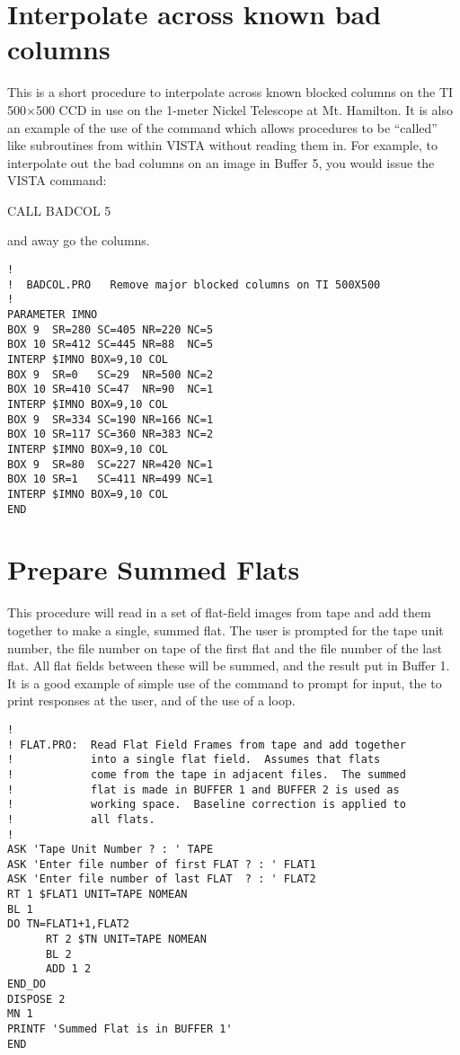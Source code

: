 
\section{Interpolate across known bad columns}

This is a short procedure to interpolate across known blocked columns on the
TI 500$\times$500 CCD in use on the 1-meter Nickel Telescope at Mt. Hamilton.
It is also an example of the use of the  command which allows
procedures to be ``called'' like subroutines from within VISTA without reading
them in.  For example, to interpolate out the bad columns on an image in
Buffer 5, you would issue the VISTA command:

\begin{command}
      \item CALL BADCOL 5
\end{command}

\noindent and away go the columns.

\begin{verbatim}
!
!  BADCOL.PRO   Remove major blocked columns on TI 500X500
!
PARAMETER IMNO
BOX 9  SR=280 SC=405 NR=220 NC=5
BOX 10 SR=412 SC=445 NR=88  NC=5
INTERP $IMNO BOX=9,10 COL
BOX 9  SR=0   SC=29  NR=500 NC=2
BOX 10 SR=410 SC=47  NR=90  NC=1
INTERP $IMNO BOX=9,10 COL
BOX 9  SR=334 SC=190 NR=166 NC=1
BOX 10 SR=117 SC=360 NR=383 NC=2
INTERP $IMNO BOX=9,10 COL
BOX 9  SR=80  SC=227 NR=420 NC=1
BOX 10 SR=1   SC=411 NR=499 NC=1
INTERP $IMNO BOX=9,10 COL
END
\end{verbatim}


\section{Prepare Summed Flats}

This procedure will read in a set of flat-field images from tape and add them
together to make a single, summed flat.  The user is prompted for the tape
unit number, the file number on tape of the first flat and the file number of
the last flat.  All flat fields between these will be summed, and the result
put in Buffer 1.  It is a good example of simple use of the  command
to prompt for input, the  to print responses at the user, and
of the use of a  loop.

\begin{verbatim}
!
! FLAT.PRO:  Read Flat Field Frames from tape and add together
!            into a single flat field.  Assumes that flats
!            come from the tape in adjacent files.  The summed
!            flat is made in BUFFER 1 and BUFFER 2 is used as
!            working space.  Baseline correction is applied to
!            all flats.
!
ASK 'Tape Unit Number ? : ' TAPE
ASK 'Enter file number of first FLAT ? : ' FLAT1
ASK 'Enter file number of last FLAT  ? : ' FLAT2
RT 1 $FLAT1 UNIT=TAPE NOMEAN
BL 1
DO TN=FLAT1+1,FLAT2
      RT 2 $TN UNIT=TAPE NOMEAN
      BL 2
      ADD 1 2
END_DO
DISPOSE 2
MN 1
PRINTF 'Summed Flat is in BUFFER 1'
END
\end{verbatim}

